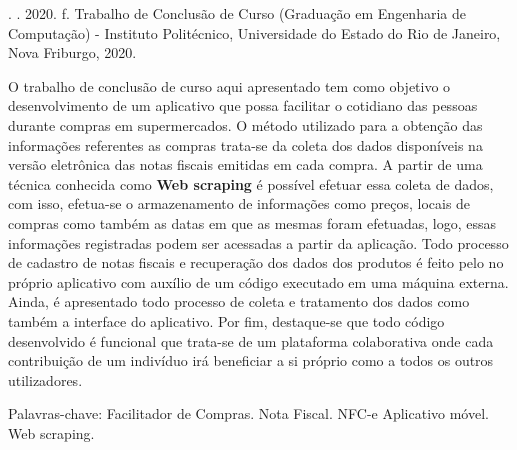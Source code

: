 \begin{resumo}

\noindent
\entradaAutor{}. \textit{\imprimirtitulo}. 2020. \pageref{LastPage} f. Trabalho de Conclusão de Curso (Graduação em Engenharia de Computação) - Instituto Politécnico, Universidade do Estado do Rio de Janeiro, Nova Friburgo, 2020.
\vspace{\onelineskip}

\setlength{\parindent}{1.3cm}
O trabalho de conclusão de curso aqui apresentado tem como objetivo o desenvolvimento de um aplicativo que possa facilitar o cotidiano das pessoas durante compras em supermercados. O método utilizado para a obtenção das informações referentes as compras trata-se da coleta dos dados disponíveis na versão eletrônica das notas fiscais emitidas em cada compra. A partir de uma técnica conhecida como \textbf{Web scraping} é possível efetuar essa coleta de dados, com isso, efetua-se o armazenamento de informações como preços, locais de compras como também as datas em que as mesmas foram efetuadas, logo, essas informações registradas podem ser acessadas a partir da aplicação. Todo processo de cadastro de notas fiscais e recuperação dos dados dos produtos é feito pelo no próprio aplicativo com auxílio de um código executado em uma máquina externa. Ainda, é apresentado todo processo de coleta e tratamento dos dados como também a interface do aplicativo. Por fim, destaque-se que todo código desenvolvido é funcional que trata-se de um plataforma colaborativa onde cada contribuição de um indivíduo irá beneficiar a si próprio como a todos os outros utilizadores.

\vspace{\onelineskip}
\noindent Palavras-chave: Facilitador de Compras. Nota Fiscal. NFC-e Aplicativo móvel. Web scraping.

\end{resumo}